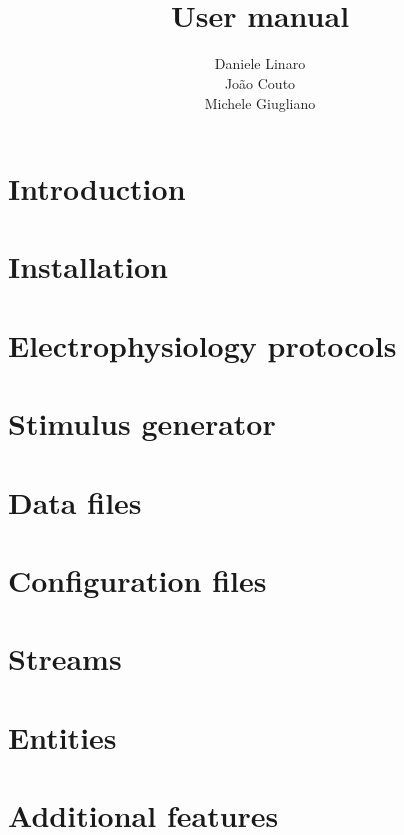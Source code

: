\documentclass[10pt,a4paper,twoside]{book}
\title{\textbf{\progname} \\ User manual}
\author{Daniele Linaro \\ Jo\~ao Couto \\ Michele Giugliano}
\date{}
\begin{document}
\maketitle
\thispagestyle{empty}

\tableofcontents
\newpage
{}

\chapter{Introduction}
\label{chap:intro}


%

\chapter{Installation}
\label{chap:install}


\chapter{Electrophysiology protocols}
\label{chap:protocols}


\chapter{Stimulus generator}
\label{chap:stimgen}


\chapter{Data files}
\label{chap:datafiles}


\chapter{Configuration files}
\label{chap:configuration}


\chapter{Streams}
\label{chap:streams}


\chapter{Entities}
\label{chap:entities}


\chapter{Additional features}
\label{chap:features}





%

%
%
\end{document}
